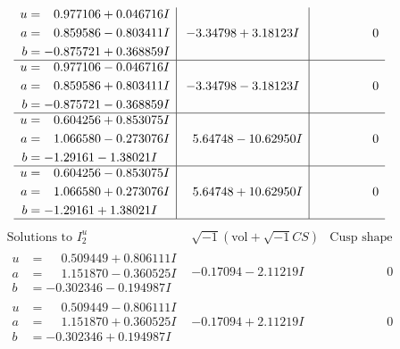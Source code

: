 \documentclass[1p]{elsarticle_modified}
\theoremstyle{definition}
\newcommand{\I}{\sqrt{-1}}
\begin{document}
$$\begin{array}{c|c|c}
\begin{aligned}
u &= \phantom{-}0.977106 + 0.046716 I \\
a &= \phantom{-}0.859586 - 0.803411 I \\
b &= -0.875721 + 0.368859 I\end{aligned}
 & -3.34798 + 3.18123 I & \phantom{-0.000000 } 0 \\ \hline\begin{aligned}
u &= \phantom{-}0.977106 - 0.046716 I \\
a &= \phantom{-}0.859586 + 0.803411 I \\
b &= -0.875721 - 0.368859 I\end{aligned}
 & -3.34798 - 3.18123 I & \phantom{-0.000000 } 0 \\ \hline\begin{aligned}
u &= \phantom{-}0.604256 + 0.853075 I \\
a &= \phantom{-}1.066580 - 0.273076 I \\
b &= -1.29161 - 1.38021 I\end{aligned}
 & \phantom{-}5.64748 - 10.62950 I & \phantom{-0.000000 } 0 \\ \hline\begin{aligned}
u &= \phantom{-}0.604256 - 0.853075 I \\
a &= \phantom{-}1.066580 + 0.273076 I \\
b &= -1.29161 + 1.38021 I\end{aligned}
 & \phantom{-}5.64748 + 10.62950 I & \phantom{-0.000000 } 0\\
 \hline 
 \end{array}$$\newpage$$\begin{array}{c|c|c}  
\text{Solutions to }I^u_{2}& \I (\text{vol} + \sqrt{-1}CS) & \text{Cusp shape}\\
 \hline 
\begin{aligned}
u &= \phantom{-}0.509449 + 0.806111 I \\
a &= \phantom{-}1.151870 - 0.360525 I \\
b &= -0.302346 - 0.194987 I\end{aligned}
 & -0.17094 - 2.11219 I & \phantom{-0.000000 } 0 \\ \hline\begin{aligned}
u &= \phantom{-}0.509449 - 0.806111 I \\
a &= \phantom{-}1.151870 + 0.360525 I \\
b &= -0.302346 + 0.194987 I\end{aligned}
 & -0.17094 + 2.11219 I & \phantom{-0.000000 } 0 \\ \hline\begin{aligned}

\end{aligned}
\end{array}$$
\end{document}
